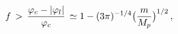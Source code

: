 \begin{equation}
f \, > \, {{\varphi_c - |\varphi_l|} \over {\varphi_c}} \,
\simeq 1 - (3 \pi)^{-1/4} \bigl( {m \over {M_p}} \bigr)^{1/2} \, ,
\end{equation}

